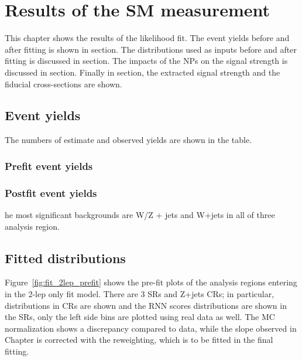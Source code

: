\chapter{Results of the SM measurement}
\label{chap:results}

This chapter shows the results of the likelihood fit.
The event yields before and after fitting is shown in section.
The distributions used as inputs before and after fitting is discussed in section.
The impacts of the NPs on the signal strength is discussed in section.
Finally in section, the extracted signal strength and the fiducial cross-sections are shown.

\section{Event yields}
\label{sec:eventyields}
The numbers of estimate and observed yields are shown in the table.
\subsection{Prefit event yields}
\subsection{Postfit event yields}
he most significant backgrounds are W/Z + jets and W+jets in all of three analysis region.
\section{Fitted distributions}
Figure~\ref{fig:fit_2lep_prefit} shows the pre-fit plots of the analysis regions entering in the 2-lep only fit model. There are 3 SRs and Z+jets CRs;
in particular, \mjjtag distributions in \Zjets CRs are shown and the RNN scores distributions are shown in the SRs, only the left side bins are plotted using real data as well. The MC normalization shows a discrepancy compared to data, while the slope observed in Chapter is corrected with the reweighting, which is to be fitted in the final fitting.

